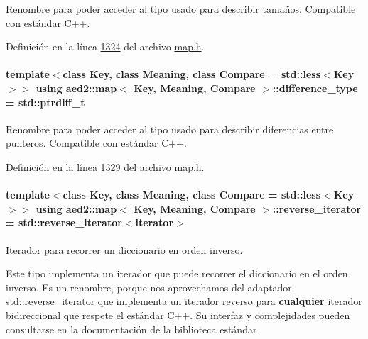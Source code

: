 Renombre para poder acceder al tipo usado para describir tamaños. Compatible con estándar C++. 



Definición en la línea \hyperlink{map_8h_source_l01324}{1324} del archivo \hyperlink{map_8h_source}{map.\-h}.

\hypertarget{classaed2_1_1map_a2f55b88809000fcbfce1c6cfef1ba74d_a2f55b88809000fcbfce1c6cfef1ba74d}{
\paragraph[{difference\-\_\-type}]{\setlength{\rightskip}{0pt plus 5cm}template$<$class Key, class Meaning, class Compare = std\-::less$<$\-Key$>$$>$ using {\bf aed2\-::map}$<$ Key, Meaning, Compare $>$\-::{\bf difference\-\_\-type} =  std\-::ptrdiff\-\_\-t}}\label{classaed2_1_1map_a2f55b88809000fcbfce1c6cfef1ba74d_a2f55b88809000fcbfce1c6cfef1ba74d}


Renombre para poder acceder al tipo usado para describir diferencias entre punteros. Compatible con estándar C++. 



Definición en la línea \hyperlink{map_8h_source_l01329}{1329} del archivo \hyperlink{map_8h_source}{map.\-h}.

\hypertarget{classaed2_1_1map_a8e6a592062260177fd73b2f9897b1dd5_a8e6a592062260177fd73b2f9897b1dd5}{
\paragraph[{reverse\-\_\-iterator}]{\setlength{\rightskip}{0pt plus 5cm}template$<$class Key, class Meaning, class Compare = std\-::less$<$\-Key$>$$>$ using {\bf aed2\-::map}$<$ Key, Meaning, Compare $>$\-::{\bf reverse\-\_\-iterator} =  std\-::reverse\-\_\-iterator$<${\bf iterator}$>$}}\label{classaed2_1_1map_a8e6a592062260177fd73b2f9897b1dd5_a8e6a592062260177fd73b2f9897b1dd5}


Iterador para recorrer un diccionario en orden inverso. 

Este tipo implementa un iterador que puede recorrer el diccionario en el orden inverso. Es un renombre, porque nos aprovechamos del adaptador {\ttfamily std\-::reverse\-\_\-iterator} que implementa un iterador reverso para {\bfseries cualquier} iterador bidireccional que respete el estándar C++. Su interfaz y complejidades pueden consultarse en la documentación de la biblioteca estándar


